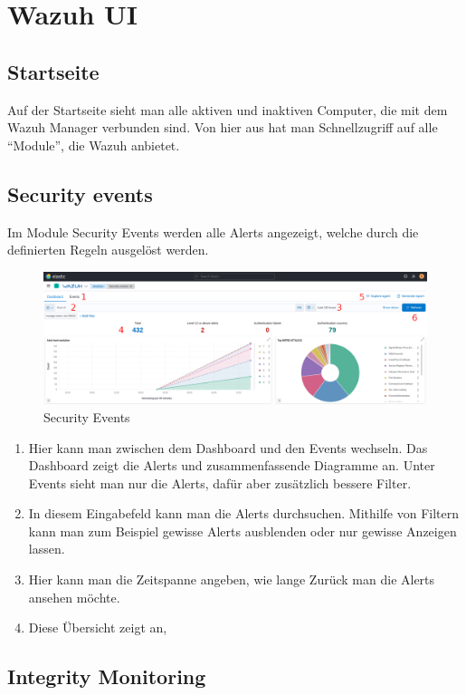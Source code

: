 \chapter{Wazuh UI}
\section{Startseite}
Auf der Startseite sieht man alle aktiven und inaktiven Computer, die mit dem Wazuh Manager verbunden sind.
Von hier aus hat man Schnellzugriff auf alle ``Module'', die Wazuh anbietet.

\section{Security events}
Im Module Security Events werden alle Alerts angezeigt, welche durch die definierten Regeln ausgelöst werden.

\begin{figure}[H]
    \centering
    \includegraphics[width=\linewidth]{../img/wazuh-se-1.png}
    \caption{Security Events}
\end{figure}

\begin{enumerate}
    \item Hier kann man zwischen dem Dashboard und den Events wechseln. Das Dashboard zeigt die Alerts und zusammenfassende Diagramme an. Unter Events sieht man nur die Alerts, dafür aber zusätzlich bessere Filter.
    \item In diesem Eingabefeld kann man die Alerts durchsuchen. Mithilfe von Filtern kann man zum Beispiel gewisse Alerts ausblenden oder nur gewisse Anzeigen lassen.
    \item Hier kann man die Zeitspanne angeben, wie lange Zurück man die Alerts ansehen möchte.
    \item Diese Übersicht zeigt an, 
\end{enumerate}

\section{Integrity Monitoring}
